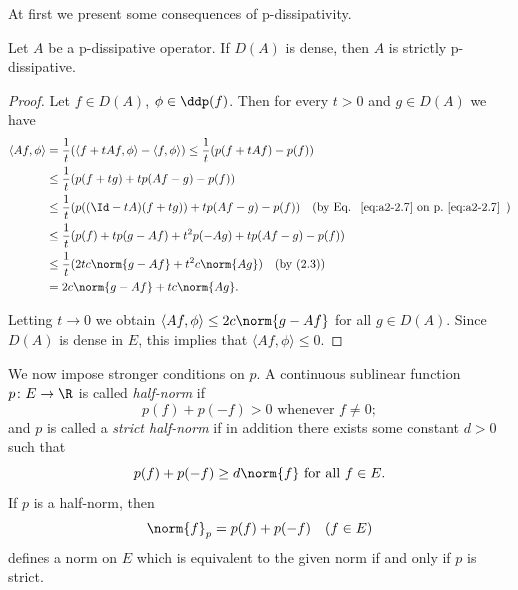 At first we present some consequences of p-dissipativity.
\begin{theorem}\label{thm:a2-2.7}
Let $A$ be a p-dissipative operator.
If\/ $D(A)$ is dense, then $A$ is strictly p-dissipative.
\end{theorem}
\begin{proof}
Let $f \in D(A)$, $\phi \in \ddp(f)$.
Then for every $t > 0$ and $g \in D(A)$ we have
\begin{align*}
\langle Af,\phi \rangle 
&= \frac{1}{t}(\langle f + tAf,\phi \rangle - \langle f,\phi \rangle) \leq \frac{1}{t}(p(f + tAf) - p(f)) \\
&\leq \frac{1}{t}(p(f + tg) + tp(Af - g) - p(f)) \\
&\leq \frac{1}{t}(p((\Id - tA)(f + tg)) + tp(Af - g) - p(f)) \quad \text{(by Eq.~\myeqpageref{eq:a2-2.7}\,)} \\ %
&\leq \frac{1}{t}(p(f) + tp(g - Af) + t^2p(-Ag) + tp(Af - g) - p(f)) \\
&\leq \frac{1}{t}(2tc\norm{g - Af} + t^2c\norm{Ag}) \quad \text{(by (2.3))} \\
&= 2c\norm{g - Af} + tc\norm{Ag}.
\end{align*}

Letting $t \to 0$ we obtain $\langle Af,\phi \rangle \leq 2c\norm{g - Af}$ for all $g \in D(A)$.
Since $D(A)$ is dense in $E$, this implies that $\langle Af,\phi \rangle \leq 0$.
\end{proof}

We now impose stronger conditions on $p$.
A continuous sublinear function $p \colon E \to \R$ is called \emph{half-norm} if
\begin{equation}\label{eq:a2-2.11}
p(f) + p(-f) > 0 \text{ whenever } f \neq 0;
\end{equation}
and $p$ is called a \emph{strict half-norm} if in addition there exists some constant $d > 0$ such that
\begin{equation}\label{eq:a2-2.12}
p(f) + p(-f) \geq d\norm{f} \text{ for all } f \in E.
\end{equation}
If\/ $p$ is a half-norm, then
\begin{equation}\label{eq:a2-2.13}
\norm{f}_p = p(f) + p(-f) \quad (f \in E)
\end{equation}
defines a norm on $E$ which is equivalent to the given norm if and only if\/ $p$ is strict.

